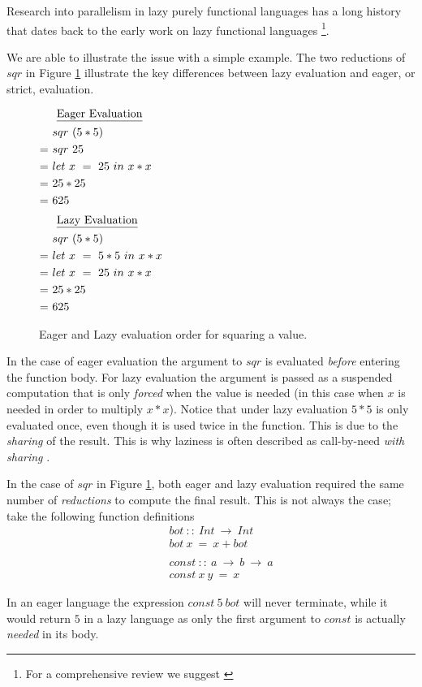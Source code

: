 Research into parallelism in lazy purely functional languages has a long
history that dates back to the early work on lazy functional languages
\citep{hughes:thesis, vGMachine, dutchBook, SPJ:PIFPL}\footnote{For a
comprehensive review we suggest \citep{hammond2000research}}. 


We are able to illustrate the issue with a simple example.  The two reductions
of $sqr$ in Figure \ref{fig:eagerandlazy} illustrate the key differences
between lazy evaluation and eager, or strict, evaluation.


\begin{figure}[!h]
\centering
\begin{multicols}{2}
\noindent
\begin{align*}
     \noalign{$\text{\underline{Eager Evaluation}}$}
     &sqr\ (5*5) \\
  =\ &sqr\ 25 \\
  =\ &let\ x\ =\ 25\ in\ x * x \\
  =\ &25 * 25 \\
  =\ &625
\end{align*}
\begin{align*}
     \noalign{$\text{\underline{Lazy Evaluation}}$}
     &sqr\ (5*5) \\
  =\ &let\ x\ =\ 5*5\ in\ x * x \\
  =\ &let\ x\ =\ 25\ in\ x * x \\
  =\ &25 * 25 \\
  =\ &625
\end{align*}
\end{multicols}
\caption{Eager and Lazy evaluation order for squaring a value.}
\label{fig:eagerandlazy}
\end{figure}

In the case of eager evaluation the argument to $sqr$ is evaluated
\emph{before} entering the function body. For lazy evaluation the argument is
passed as a suspended computation that is only \emph{forced} when the value is
needed (in this case when $x$ is needed in order to multiply $x*x$). Notice
that under lazy evaluation $5*5$ is only evaluated once, even though it is
used twice in the function. This is due to the \emph{sharing} of the result.
This is why laziness is often described as call-by-need \emph{with sharing}
\citep{hammond2000research}.

\medskip

In the case of $sqr$ in Figure \ref{fig:eagerandlazy}, both eager and lazy
evaluation required the same number of \emph{reductions} to compute the final
result. This is not always the case; take the following function definitions
\begin{align*}
    &bot \ :: \ Int\ \rightarrow\ Int \\
    &bot\ x\ =\ x + bot \\
    \quad & \\
    &const\ :: \ a\ \rightarrow\ b\ \rightarrow\ a \\
    &const\ x\ y\ =\ x
\end{align*}
\label{fig:botAndConst}

In an eager language the expression $const\ 5\ bot$ will never terminate,
while it would return $5$ in a lazy language as only the first argument
to $const$ is actually \emph{needed} in its body.

\medskip


